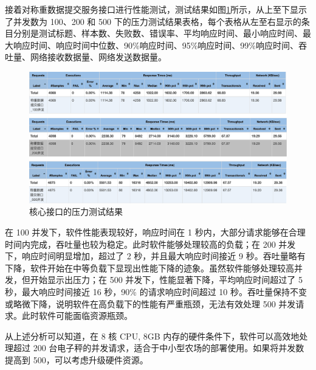 接着对称重数据提交服务接口进行性能测试，测试结果如图\ref{fig:jmeter-test-result}所示，从上至下显示了并发数为 100、200 和 500 下的压力测试结果表格，每个表格从左至右显示的条目分别是测试标题、样本数、失败数、错误率、平均响应时间、最小响应时间、最大响应时间、响应时间中位数、90\%响应时间、95\%响应时间、99\%响应时间、吞吐量、网络接收数据量、网络发送数据量。

\begin{figure}
    \centering
    \includegraphics[width=0.95\linewidth]{../source/aws-test/jmeter-test-result.png}
    \caption{核心接口的压力测试结果}
    \label{fig:jmeter-test-result}
\end{figure}

在 100 并发下，软件性能表现较好，响应时间在 1 秒内，大部分请求能够在合理时间内完成，吞吐量也较为稳定。此时软件能够处理较高的负载；在 200 并发下，响应时间明显增加，超过了 2 秒，并且最大响应时间接近 9 秒。吞吐量略有下降，软件开始在中等负载下显现出性能下降的迹象。虽然软件能够处理较高并发，但开始显示出压力；在 500 并发下，性能显著下降，平均响应时间超过了 5 秒，最大响应时间接近 16 秒，90\% 的请求响应时间超过 10 秒。吞吐量保持不变或略微下降，说明软件在高负载下的性能有严重瓶颈，无法有效处理 500 并发请求。此时软件可能面临资源瓶颈。

从上述分析可以知道，在 8 核 CPU, 8GB 内存的硬件条件下，软件可以高效地处理超过 200 台电子秤的并发请求，适合于中小型农场的部署使用。如果将并发数提高到 500，可以考虑升级硬件资源。


